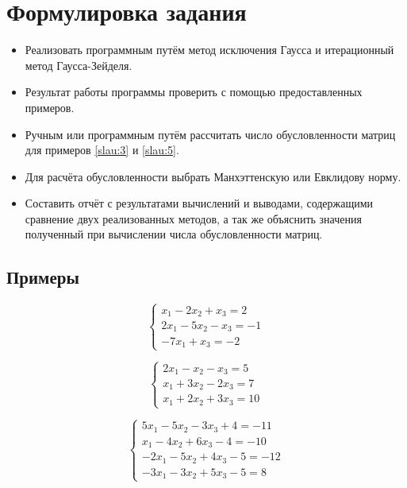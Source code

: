 \documentclass[a4paper]{article}
\begin{document}
\section{Формулировка задания}
\begin{itemize}
    \item Реализовать программным путём метод исключения Гаусса и итерационный метод Гаусса-Зейделя. 
    \item Результат работы программы проверить с помощью предоставленных примеров.
    \item Ручным или программным путём рассчитать число обусловленности матриц для примеров \eqref{slau:3} и \eqref{slau:5}.
    \item Для расчёта обусловленности выбрать Манхэттенскую или Евклидову норму.
    \item Составить отчёт с результатами вычислений и выводами, содержащими сравнение двух реализованных методов, а так же объяснить значения полученный при вычислении числа обусловленности матриц.
\end{itemize}

\subsection{Примеры}

\begin{equation}
    \begin{cases*}
           x_1  -2 x_2 + x_3 = 2 \\
         2 x_1  -5 x_2 - x_3 = -1 \\
        -7 x_1  +  x_3       = -2
    \end{cases*} \label{slau:1}
\end{equation}

\begin{equation}
    \begin{cases*}
        2 x_1 -   x_2 -   x_3 = 5 \\
          x_1 + 3 x_2 - 2 x_3 = 7 \\
          x_1 + 2 x_2 + 3 x_3 = 10
    \end{cases*} \label{slau:2}
\end{equation}

\begin{equation}
    \begin{cases}
         5 x_1 -5 x_2 -3 x_3 +4 = -11 \\
           x_1 -4 x_2 +6 x_3 -4 = -10 \\
        -2 x_1 -5 x_2 +4 x_3 -5 = -12 \\
        -3 x_1 -3 x_2 +5 x_3 -5 = 8
    \end{cases} \label{slau:3}
\end{equation}
\end{document}
